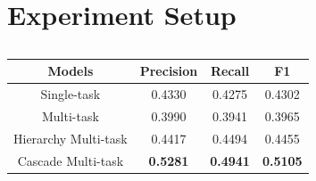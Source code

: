 \section{Experiment Setup}

\begin{table}[htbp]
	\label{tab:eval1}
	\centering
	\caption{}
	\scriptsize
	\begin{tabular}{c|ccc}
		\toprule
		Models & Precision & Recall & F1 \\
		\midrule
		Single-task & 0.4330 & 0.4275 & 0.4302 \\
		\midrule
		Multi-task & 0.3990 & 0.3941 & 0.3965 \\
		Hierarchy Multi-task & 0.4417 & 0.4494 &  0.4455 \\
		\midrule
		Cascade Multi-task & \textbf{0.5281} & \textbf{0.4941} & \textbf{0.5105} \\
		\bottomrule
	\end{tabular}
	\vspace{-10pt}
\end{table}


